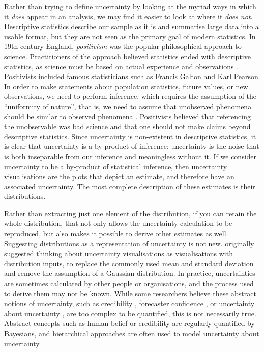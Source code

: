 \documentclass[]{ar-1col-S2O}
\begin{document}
Rather than trying to define uncertainty by looking at the myriad ways
in which it \emph{does} appear in an analysis, we may find it easier to
look at where it \emph{does not}. Descriptive statistics describe our
sample as it is and summarise large data into a usable format, but they
are not seen as the primary goal of modern statistics. In 19th-century
England, \emph{positivism} was the popular philosophical approach to
science. Practitioners of the approach believed statistics ended with
descriptive statistics, as science must be based on actual experience
and observations \citep{Otsuka2023}. Positivists included famous
statisticians such as Francis Galton and Karl Pearson. In order to make
statements about population statistics, future values, or new
observations, we need to perform inference, which requires the
assumption of the ``uniformity of nature'', that is, we need to assume
that unobserved phenomena should be similar to observed phenomena
\citep{Otsuka2023}. Positivists believed that referencing the
unobservable was bad science and that one should not make claims beyond
descriptive statistics. Since uncertainty is non-existent in descriptive
statistics, it is clear that uncertainty is a by-product of inference:
uncertainty is the noise that is both inseparable from our inference and
meaningless without it. If we consider uncertainty to be a by-product of
statistical inference, then uncertainty visualisations are the plots
that depict an estimate, and therefore have an associated uncertainty.
The most complete description of these estimates is their distributions.

Rather than extracting just one element of the distribution, if you can
retain the whole distribution, that not only allows the uncertainty
calculation to be reproduced, but also makes it possible to derive other
estimates as well. Suggesting distributions as a representation of
uncertainty is not new. \citet{Kay2023} originally suggested thinking
about uncertainty visualisations as visualisations with distribution
inputs, to replace the commonly used mean and standard deviation and
remove the assumption of a Gaussian distribution. In practice,
uncertainties are sometimes calculated by other people or organisations,
and the process used to derive them may not be known. While some
researchers believe these abstract notions of uncertainty, such as
credibility \citep{Thomson2005}, forecaster confidence
\citep{Padilla2021}, or uncertainty about uncertainty
\citep{Hadjimichael2024}, are too complex to be quantified, this is not
necessarily true. Abstract concepts such as human belief or credibility
are regularly quantified by Bayesians, and hierarchical approaches are
often used to model uncertainty about uncertainty.
\end{document}

